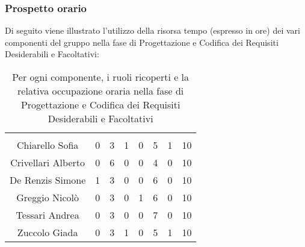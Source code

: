 \subsubsection{Prospetto orario}
Di seguito viene illustrato l'utilizzo della risorsa tempo (espresso in ore) dei vari componenti del gruppo nella fase di Progettazione e Codifica dei Requisiti Desiderabili e Facoltativi:

\begin{table}[H]
	\begin{center}
		\begin{tabular}{c
				!{\color[HTML]{9b240a}\vrule width 1pt}
				cccccc
				!{\color[HTML]{9b240a}\vrule width 1pt}	
				c}
			\rowcolorhead
			 &  &  &  &  &  &  &  \\
			
			Chiarello Sofia & 0 & 3 & 1 & 0 & 5 & 1 & 10\\
			Crivellari Alberto & 0 & 6 & 0 & 0 & 4 & 0 & 10\\
			De Renzis Simone & 1 & 3 & 0 & 0 & 6 & 0 & 10\\
			Greggio Nicolò & 0 & 3 & 0 & 1 & 6 & 0 & 10\\
			Tessari Andrea & 0 & 3 & 0 & 0 & 7 & 0 & 10\\
			Zuccolo Giada & 0 & 3 & 1 & 0 & 5 & 1 & 10\\
		\end{tabular}
		\caption[Occupazione oraria Progettazione e Codifica dei Requisiti Desiderabili e Facoltativi]{Per ogni componente, i ruoli ricoperti e la relativa occupazione oraria nella fase di Progettazione e Codifica dei Requisiti Desiderabili e Facoltativi}
	\end{center}
\end{table}


